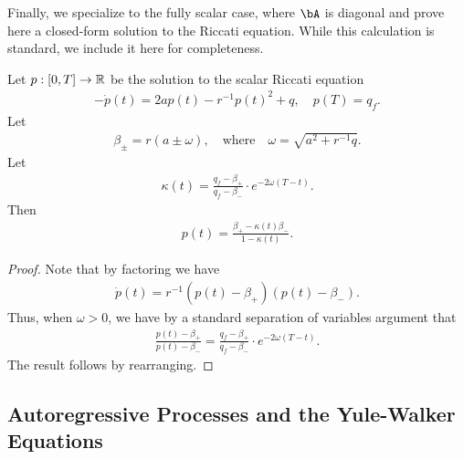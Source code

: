 Finally, we specialize to the fully scalar case, where $\bA$ is diagonal and prove here a closed-form solution to the Riccati equation.  While this calculation is standard, we include it here for completeness.
\begin{lemma}\label{lem:scalar-riccati-solution}
    Let $p: [0, T] \to \mathbb{R}$ be the solution to the scalar Riccati equation
    \begin{align}
        - \dot{p}(t) = 2 a p(t) - r^{-1} p(t)^2 + q, \quad p(T) = q_f.
    \end{align}
    Let
    \begin{align}
        \beta_{\pm} = r ( a \pm \omega), \quad \text{where} \quad \omega = \sqrt{a^2 + r^{-1} q}.
    \end{align}
    Let
    \begin{align}
        \kappa(t) = \frac{q_f - \beta_+}{q_f - \beta_-} \cdot e^{- 2 \omega(T - t)}.
    \end{align}
    Then
    \begin{align}\label{eq:scalar-riccati-solution}
        p(t) = \frac{\beta_+ - \kappa(t) \beta_-}{1 - \kappa(t)}.
    \end{align}
\end{lemma}
\begin{proof}
    Note that by factoring we have
    \begin{align}
        \dot{p}(t) = r^{-1} \left( p(t) - \beta_+ \right)\left( p(t) - \beta_- \right).
    \end{align}
    Thus, when $\omega > 0$, we have by a standard separation of variables argument that
    \begin{align}
        \frac{p(t) - \beta_+}{p(t) - \beta_-} = \frac{q_f - \beta_+}{q_f - \beta_-} \cdot e^{- 2 \omega(T - t)}.
    \end{align}
    The result follows by rearranging.
\end{proof}






\subsection{Autoregressive Processes and the Yule-Walker Equations}\label{app:ar_processes}

